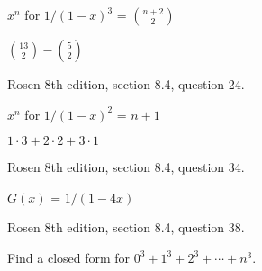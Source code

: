 \SOLUTION

$x^n$ for $1/(1-x)^3$ = $\binom{n+2}{2}$

$\binom{13}{2} - \binom{5}{2}$



\newpage
\nextq Rosen 8th edition, section 8.4, question 24.

\SOLUTION

$ x^n $ for $1/(1-x)^2$ = $n+1$

$1 \cdot 3 + 2 \cdot 2 + 3 \cdot 1$



\newpage
\nextq Rosen 8th edition, section 8.4, question 34.

\SOLUTION

$G(x)$ = $ 1/(1-4x)$





\newpage
\nextq Rosen 8th edition, section 8.4, question 38.

\SOLUTION



\newpage
\nextq Find a closed form for $0^3 + 1^3 + 2^3 + \cdots + n^3$.

\SOLUTION



\newpage


